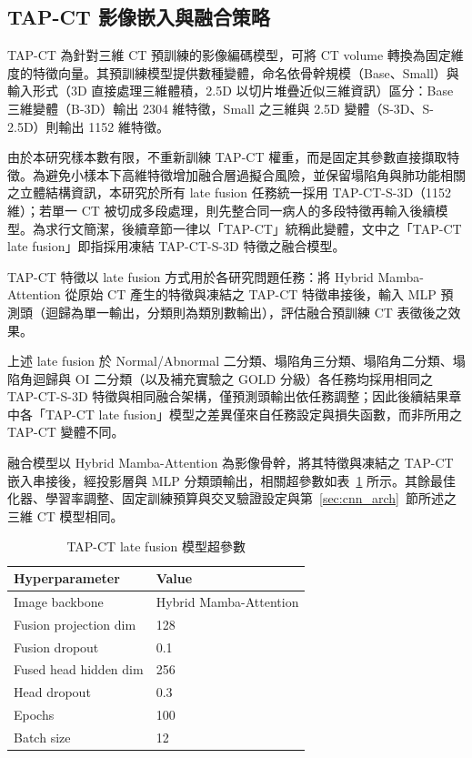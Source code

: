 \begin{ZhChapter}
\section{TAP-CT 影像嵌入與融合策略}\label{sec:tapct_fusion}

TAP-CT 為針對三維 CT 預訓練的影像編碼模型，可將 CT volume 轉換為固定維度的特徵向量\cite{veenboer2025tapct}。其預訓練模型提供數種變體，命名依骨幹規模（Base、Small）與輸入形式（3D 直接處理三維體積，2.5D 以切片堆疊近似三維資訊）區分：Base 三維變體（B-3D）輸出 2304 維特徵，Small 之三維與 2.5D 變體（S-3D、S-2.5D）則輸出 1152 維特徵。

由於本研究樣本數有限，不重新訓練 TAP-CT 權重，而是固定其參數直接擷取特徵。為避免小樣本下高維特徵增加融合層過擬合風險，並保留塌陷角與肺功能相關之立體結構資訊，本研究於所有 late fusion 任務統一採用 TAP-CT-S-3D（1152 維）；若單一 CT 被切成多段處理，則先整合同一病人的多段特徵再輸入後續模型。為求行文簡潔，後續章節一律以「TAP-CT」統稱此變體，文中之「TAP-CT late fusion」即指採用凍結 TAP-CT-S-3D 特徵之融合模型。

TAP-CT 特徵以 late fusion 方式用於各研究問題任務：將 Hybrid Mamba-Attention 從原始 CT 產生的特徵與凍結之 TAP-CT 特徵串接後，輸入 MLP 預測頭（迴歸為單一輸出，分類則為類別數輸出），評估融合預訓練 CT 表徵後之效果。

上述 late fusion 於 Normal/Abnormal 二分類、塌陷角三分類、塌陷角二分類、塌陷角迴歸與 OI 二分類（以及補充實驗之 GOLD 分級）各任務均採用相同之 TAP-CT-S-3D 特徵與相同融合架構，僅預測頭輸出依任務調整；因此後續結果章中各「TAP-CT late fusion」模型之差異僅來自任務設定與損失函數，而非所用之 TAP-CT 變體不同。

融合模型以 Hybrid Mamba-Attention 為影像骨幹，將其特徵與凍結之 TAP-CT 嵌入串接後，經投影層與 MLP 分類頭輸出，相關超參數如表~\ref{tab:fusion_hparams} 所示。其餘最佳化器、學習率調整、固定訓練預算與交叉驗證設定與第~\ref{sec:cnn_arch}~節所述之三維 CT 模型相同。

\begin{table}[htbp]
\centering
\caption{TAP-CT late fusion 模型超參數}
\label{tab:fusion_hparams}
\begingroup
\renewcommand{\arraystretch}{1.45}
\begin{tabular}{|l|l|}
\hline
\textbf{Hyperparameter} & \textbf{Value} \\
\hline
Image backbone & Hybrid Mamba-Attention \\
\hline
Fusion projection dim & 128 \\
\hline
Fusion dropout & 0.1 \\
\hline
Fused head hidden dim & 256 \\
\hline
Head dropout & 0.3 \\
\hline
Epochs & 100 \\
\hline
Batch size & 12 \\
\hline
\end{tabular}
\endgroup
\end{table}


\end{ZhChapter}
